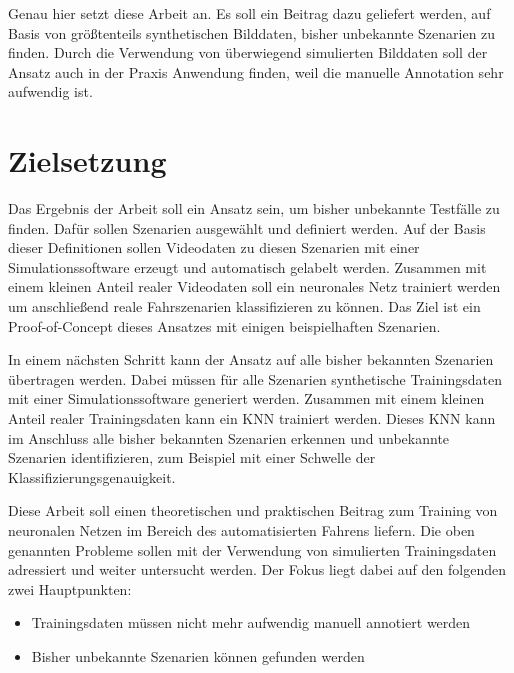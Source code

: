 Genau hier setzt diese Arbeit an. Es soll ein Beitrag dazu geliefert werden, auf Basis von größtenteils synthetischen Bilddaten, bisher unbekannte Szenarien zu finden. Durch die Verwendung von überwiegend simulierten Bilddaten soll der Ansatz auch in der Praxis Anwendung finden, weil die manuelle Annotation sehr aufwendig ist.


\section{Zielsetzung}
\label{einleitung_zielsetzung}

Das Ergebnis der Arbeit soll ein Ansatz sein, um bisher unbekannte Testfälle zu finden. Dafür sollen Szenarien ausgewählt und definiert werden. Auf der Basis dieser Definitionen sollen Videodaten zu diesen Szenarien mit einer Simulationssoftware erzeugt und automatisch gelabelt werden. Zusammen mit einem kleinen Anteil realer Videodaten soll ein neuronales Netz trainiert werden um anschließend reale Fahrszenarien klassifizieren zu können. Das Ziel ist ein Proof-of-Concept dieses Ansatzes mit einigen beispielhaften Szenarien.

In einem nächsten Schritt kann der Ansatz auf alle bisher bekannten Szenarien übertragen werden. Dabei müssen für alle Szenarien synthetische Trainingsdaten mit einer Simulationssoftware generiert werden. Zusammen mit einem kleinen Anteil realer Trainingsdaten kann ein \ac{KNN} trainiert werden. Dieses \ac{KNN} kann im Anschluss alle bisher bekannten Szenarien erkennen und unbekannte Szenarien identifizieren, zum Beispiel mit einer Schwelle der Klassifizierungsgenauigkeit.

Diese Arbeit soll einen theoretischen und praktischen Beitrag zum Training von neuronalen Netzen im Bereich des automatisierten Fahrens liefern. Die oben genannten Probleme sollen mit der Verwendung von simulierten Trainingsdaten adressiert und weiter untersucht werden. Der Fokus liegt dabei auf den folgenden zwei Hauptpunkten:

\begin{itemize}
\item Trainingsdaten müssen nicht mehr aufwendig manuell annotiert werden
\item Bisher unbekannte Szenarien können gefunden werden
\end{itemize}

